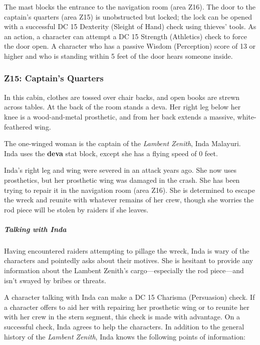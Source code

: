 \documentclass[10pt,a4paper,twoside,bg=print,twocolumn,openany,nodeprecatedcode]{dndbook}
\begin{document}
The mast blocks the entrance to the navigation room (area Z16). The door to the captain's quarters (area Z15) is unobstructed but locked; the lock can be opened with a successful DC 15 Dexterity (Sleight of Hand) check using thieves' tools. As an action, a character can attempt a DC 15 Strength (Athletics) check to force the door open. A character who has a passive Wisdom (Perception) score of 13 or higher and who is standing within 5 feet of the door hears someone inside.

\subsubsection{Z15: Captain's Quarters}
\begin{DndReadAloud}{}
In this cabin, clothes are tossed over chair backs, and open books are strewn across tables. At the back of the room stands a deva. Her right leg below her knee is a wood-and-metal prosthetic, and from her back extends a massive, white-feathered wing.

\end{DndReadAloud}

The one-winged woman is the captain of the \textit{Lambent Zenith}, Inda Malayuri. Inda uses the \textbf{deva} stat block, except she has a flying speed of 0 feet.

Inda's right leg and wing were severed in an attack years ago. She now uses prosthetics, but her prosthetic wing was damaged in the crash. She has been trying to repair it in the navigation room (area Z16). She is determined to escape the wreck and reunite with whatever remains of her crew, though she worries the rod piece will be stolen by raiders if she leaves.

\subparagraph{Talking with Inda}
Having encountered raiders attempting to pillage the wreck, Inda is wary of the characters and pointedly asks about their motives. She is hesitant to provide any information about the Lambent Zenith's cargo—especially the rod piece—and isn't swayed by bribes or threats.

A character talking with Inda can make a DC 15 Charisma (Persuasion) check. If a character offers to aid her with repairing her prosthetic wing or to reunite her with her crew in the stern segment, this check is made with advantage. On a successful check, Inda agrees to help the characters. In addition to the general history of the \textit{Lambent Zenith}, Inda knows the following points of information:
\end{document}
